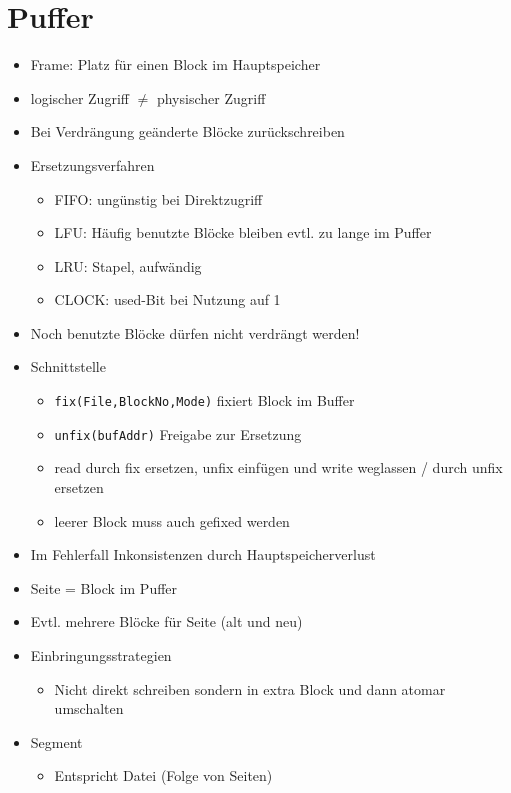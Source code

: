\documentclass[11pt, paper=a4, twocolumn]{scrartcl}
\begin{document}
	\section{Puffer}
		\begin{itemize}
			\item Frame: Platz für einen Block im Hauptspeicher
			\item logischer Zugriff $\neq$ physischer Zugriff
			\item Bei Verdrängung geänderte Blöcke zurückschreiben
			\item Ersetzungsverfahren
				\begin{itemize}
					\item FIFO: ungünstig bei Direktzugriff
					\item LFU: Häufig benutzte Blöcke bleiben evtl. zu 
						lange im Puffer
					\item LRU: Stapel, aufwändig
					\item CLOCK: used-Bit bei Nutzung auf 1 
				\end{itemize}
			\item Noch benutzte Blöcke dürfen nicht verdrängt werden!
			\item Schnittstelle
				\begin{itemize}
					\item \texttt{fix(File,BlockNo,Mode)} fixiert 
						Block im Buffer
					\item \texttt{unfix(bufAddr)} Freigabe zur 
						Ersetzung
					\item read durch fix ersetzen, unfix einfügen und 
						write weglassen / durch unfix ersetzen
					\item leerer Block muss auch gefixed werden
				\end{itemize}
			\item Im Fehlerfall Inkonsistenzen durch Hauptspeicherverlust
			\item Seite = Block im Puffer
			\item Evtl. mehrere Blöcke für Seite (alt und neu)	
			\item Einbringungsstrategien
				\begin{itemize}
					\item Nicht direkt schreiben sondern in extra 
						Block und dann atomar umschalten
				\end{itemize}
			\item Segment
				\begin{itemize}
					\item Entspricht Datei (Folge von Seiten)

\end{itemize}
\end{itemize}
\end{document}
